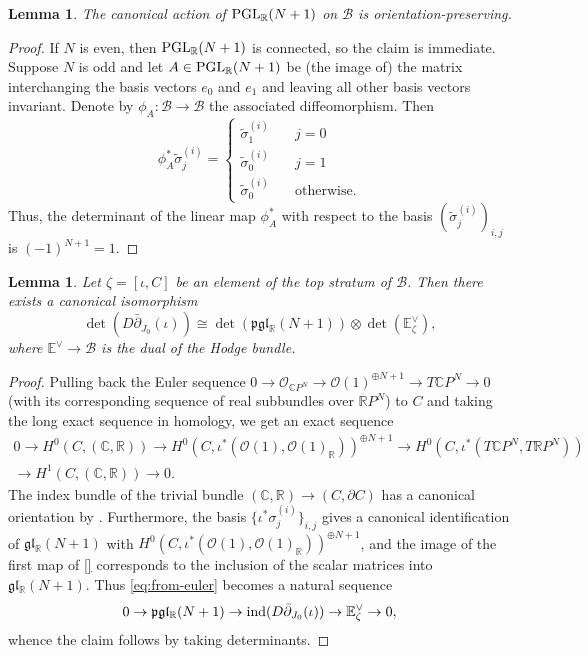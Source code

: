 \documentclass[11pt,psamsfonts, oneside, reqno]{amsart}
\newcommand{\cl}{\colon}
\newcommand{\dul}{^\vee}
\newcommand{\PGL}{\normalfont\text{PGL}}
\newcommand{\delbar}{\bar\partial}
\newcommand{\del}{\partial}
\newcommand{\bC}{\mathbb{C}}
\newcommand{\bE}{\mathbb{E}}
\newcommand{\bR}{\mathbb{R}}
\newcommand{\cB}{\mathcal{B}}
\newcommand{\cO}{\mathcal{O}}
\newcommand{\fg}{\mathfrak{g}}
\newcommand{\fl}{\mathfrak{l}}
\newcommand{\fp}{\mathfrak{p}}
\newcommand{\wt}{\widetilde}
\newcommand{\ind}{\normalfont\text{ind}}
\newcommand{\hodge}{\bE\dul}
\newtheorem{lemma}[theorem]{Lemma}
\theoremstyle{definition}
\theoremstyle{remark}
\numberwithin{equation}{section}
\begin{document}
\begin{lemma}\label{lem:action-base-space} The canonical action of $\PGL_\bR(N+1)$ on $\cB$ is orientation-preserving.\end{lemma}

\begin{proof} If $N$ is even, then $\PGL_\bR(N+1)$ is connected, so the claim is immediate. Suppose $N$ is odd and let $A \in \PGL_\bR(N+1)$ be (the image of) the matrix interchanging the basis vectors $e_0$ and $e_1$ and leaving all other basis vectors invariant. Denote by $\phi_A\cl \cB \to \cB$ the associated diffeomorphism. Then 
	$$\phi_A^*\wt\sigma^{(i)}_j = \begin{cases}
		\wt\sigma^{(i)}_1 \quad & j = 0\\
		\wt\sigma^{(i)}_0 \quad & j = 1\\
		\wt\sigma^{(i)}_0 \quad & \text{otherwise}.\end{cases}$$\noindent
	Thus, the determinant of the linear map $\phi_A^*$ with respect to the basis $(\wt\sigma^{(i)}_j)_{i,j}$ is $(-1)^{N+1} = 1$.
\end{proof}

\begin{lemma}\label{lem:orientation-base} Let $\zeta = [\iota,C]$ be an element of the top stratum of $\cB$. Then there exists a canonical isomorphism $$\det(D\delbar_{J_0}(\iota)) \cong \det(\fp\fg\fl_\bR(N+1))\otimes \det(\hodge_\zeta),$$\noindent
	where $\hodge \to \cB$ is the dual of the Hodge bundle. 
\end{lemma}

\begin{proof} Pulling back the Euler sequence $0 \to \cO_{\bC P^N}\to \cO(1)^{\oplus N+1}\to T\bC P^N \to 0$ (with its corresponding sequence of real subbundles over $\bR P^N$) to $C$ and taking the long exact sequence in homology, we get an exact sequence 
	\begin{multline}\label{eq:from-euler} 0 \to H^0(C,(\bC,\bR))\to H^0(C,\iota^*(\cO(1),\cO(1)_\bR))^{\oplus N+1}\to H^0(C,\iota^*(T\bC P^N,T\bR P^N))\\\to H^1(C,(\bC,\bR))\to 0. \end{multline}
	The index bundle of the trivial bundle $(\bC,\bR)\to (C,\del C)$ has a canonical orientation by \cite[Proposition~4.1.1]{WW17}. Furthermore, the basis $\{\iota^*\sigma_j^{(i)}\}_{i,j}$ gives a canonical identification of $\fg\fl_\bR(N+1)$ with $H^0(C,\iota^*(\cO(1),\cO(1)_\bR))^{\oplus N+1}$, and the image of the first map of \eqref{} corresponds to the inclusion of the scalar matrices into $\fg\fl_\bR(N+1)$. Thus \eqref{eq:from-euler} becomes a natural sequence
	$$0 \to \fp\fg\fl_\bR(N+1) \to \ind(D\delbar_{J_0}(\iota))\to \hodge_\zeta\to 0,$$\noindent
	whence the claim follows by taking determinants.\end{proof}
\end{document}
